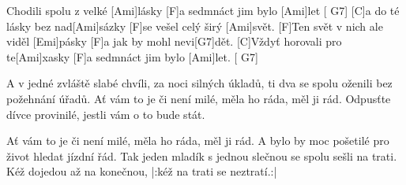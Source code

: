 
\sloka
[C]Chodili spolu z velké [Ami]lásky [F]a sedmnáct jim bylo [Ami]let [ G7]
[C]a do té lásky bez nad[Ami]sázky [F]se vešel celý širý [Ami]svět.
[F]Ten svět v nich ale viděl [Emi]pásky [F]a jak by mohl nevi[G7]dět.
[C]Vždyť horovali pro te[Ami]xasky [F]a sedmnáct jim bylo [Ami]let. [ G7]

\sloka
A v jedné zvláště slabé chvíli, za noci silných úkladů,
ti dva se spolu oženili bez požehnání úřadů.
Ať vám to je či není milé, měla ho ráda, měl ji rád.
Odpusťte dívce provinilé, jestli vám o to bude stát.

\sloka
Ať vám to je či není milé, měla ho ráda, měl ji rád.
A bylo by moc pošetilé pro život hledat jízdní řád.
Tak jeden mladík s jednou slečnou se spolu sešli na trati.
Kéž dojedou až na konečnou, |:kéž na trati se neztratí.:|
